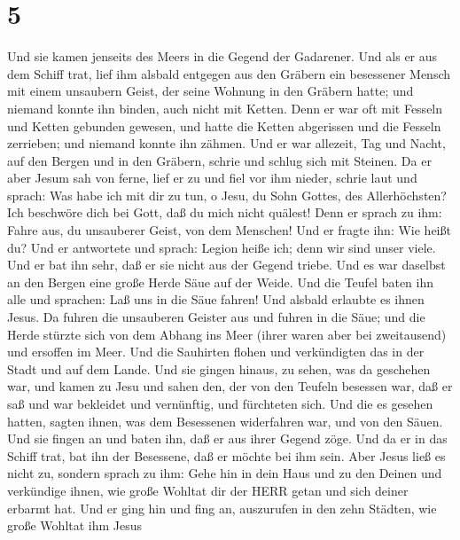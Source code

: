 \hypertarget{section-4}{%
\section{5}\label{section-4}}

 Und sie kamen jenseits des Meers in die Gegend der
Gadarener.  Und als er aus dem Schiff trat, lief ihm alsbald
entgegen aus den Gräbern ein besessener Mensch mit einem unsaubern
Geist,  der seine Wohnung in den Gräbern hatte; und niemand
konnte ihn binden, auch nicht mit Ketten.  Denn er war oft
mit Fesseln und Ketten gebunden gewesen, und hatte die Ketten abgerissen
und die Fesseln zerrieben; und niemand konnte ihn zähmen. 
Und er war allezeit, Tag und Nacht, auf den Bergen und in den Gräbern,
schrie und schlug sich mit Steinen.  Da er aber Jesum sah
von ferne, lief er zu und fiel vor ihm nieder, schrie laut und sprach:
 Was habe ich mit dir zu tun, o Jesu, du Sohn Gottes, des
Allerhöchsten? Ich beschwöre dich bei Gott, daß du mich nicht quälest!
 Denn er sprach zu ihm: Fahre aus, du unsauberer Geist, von
dem Menschen!  Und er fragte ihn: Wie heißt du? Und er
antwortete und sprach: Legion heiße ich; denn wir sind unser viele.
 Und er bat ihn sehr, daß er sie nicht aus der Gegend
triebe.  Und es war daselbst an den Bergen eine große Herde
Säue auf der Weide.  Und die Teufel baten ihn alle und
sprachen: Laß uns in die Säue fahren!  Und alsbald erlaubte
es ihnen Jesus. Da fuhren die unsauberen Geister aus und fuhren in die
Säue; und die Herde stürzte sich von dem Abhang ins Meer (ihrer waren
aber bei zweitausend) und ersoffen im Meer.  Und die
Sauhirten flohen und verkündigten das in der Stadt und auf dem Lande.
Und sie gingen hinaus, zu sehen, was da geschehen war,  und
kamen zu Jesu und sahen den, der von den Teufeln besessen war, daß er
saß und war bekleidet und vernünftig, und fürchteten sich. 
Und die es gesehen hatten, sagten ihnen, was dem Besessenen widerfahren
war, und von den Säuen.  Und sie fingen an und baten ihn,
daß er aus ihrer Gegend zöge.  Und da er in das Schiff
trat, bat ihn der Besessene, daß er möchte bei ihm sein. 
Aber Jesus ließ es nicht zu, sondern sprach zu ihm: Gehe hin in dein
Haus und zu den Deinen und verkündige ihnen, wie große Wohltat dir der
HERR getan und sich deiner erbarmt hat.  Und er ging hin
und fing an, auszurufen in den zehn Städten, wie große Wohltat ihm Jesus
